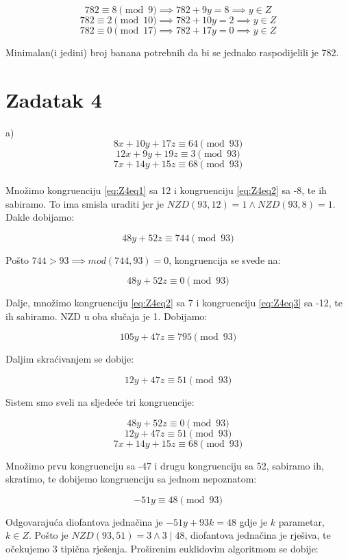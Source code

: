 \documentclass[12pt]{article}
\begin{document}
$$782 \equiv 8 \pmod{9} \implies 782 + 9y = 8 \implies y \in Z$$
$$782 \equiv 2 \pmod{10} \implies 782 + 10y = 2 \implies y \in Z$$
$$782 \equiv 0 \pmod{17} \implies 782 + 17y = 0 \implies y \in Z$$\vspace{1mm}

Minimalan(i jedini) broj banana potrebnih da bi se jednako raspodijelili je 782.

\section*{Zadatak 4\label{Z4}}

a)
\[
8x + 10y + 17z \equiv 64 \pmod{93} \label{eq:Z4eq1} \tag{1}
\]
\[
12x + 9y + 19z \equiv 3 \pmod{93} \label{eq:Z4eq2} \tag{2}
\]
\[
7x + 14y + 15z \equiv 68 \pmod{93} \label{eq:Z4eq3} \tag{3}
\]
\\
Množimo kongruenciju \ref{eq:Z4eq1} sa 12 i kongruenciju \ref{eq:Z4eq2} sa -8, te ih sabiramo. To ima smisla uraditi jer je $NZD(93, 12) = 1 \land NZD(93, 8) = 1$. Dakle dobijamo:

$$48y + 52z \equiv 744 \pmod{93}$$\vspace{1mm}

Pošto $744 > 93 \implies mod(744, 93) = 0$, kongruencija se svede na:

$$48y + 52z \equiv 0 \pmod{93}$$ \vspace{1mm}

Dalje, množimo kongruenciju \ref{eq:Z4eq2} sa 7 i kongruenciju \ref{eq:Z4eq3} sa -12, te ih sabiramo. NZD u oba slučaja je 1. Dobijamo:

$$105y + 47z \equiv 795 \pmod{93}$$\vspace{1mm}

Daljim skraćivanjem se dobije:

$$12y + 47z \equiv 51 \pmod{93}$$\vspace{1mm}

Sistem smo sveli na sljedeće tri kongruencije:

$$48y + 52z \equiv 0 \pmod{93}$$
$$12y + 47z \equiv 51 \pmod{93}$$
$$7x + 14y + 15z \equiv 68 \pmod{93}$$\vspace{1mm}

Množimo prvu kongruenciju sa -47 i drugu kongruenciju sa 52, sabiramo ih, skratimo, te dobijemo kongruenciju sa jednom nepoznatom:

$$-51y \equiv 48 \pmod{93}$$\vspace{1mm}

Odgovarajuća diofantova jednačina je $-51y + 93k = 48$ gdje je $k$ parametar, $k \in Z$. Pošto je $NZD(93, 51) = 3 \land 3 \mid 48$, diofantova jednačina je rješiva, te očekujemo 3 tipična rješenja. Proširenim euklidovim algoritmom se dobije:
\end{document}
